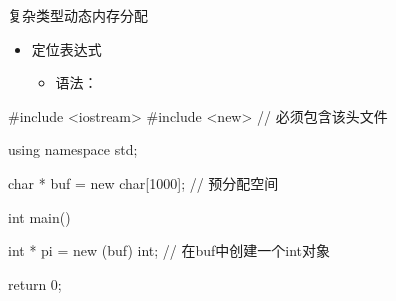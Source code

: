 \begin{frame}[fragile]{复杂类型}{动态内存分配}
  \begin{itemize}
  \item 定位表达式
    \begin{itemize}
    \item 语法：
    \end{itemize}  
  \end{itemize}
  \begin{center}
    \begin{minipage}{0.7\linewidth}
      \begin{cppcode}
#include <iostream>
#include <new> // 必须包含该头文件

using namespace std;

char * buf = new char[1000]; // 预分配空间        

int main()
{
    int * pi = new (buf) int; // 在buf中创建一个int对象

    return 0;
}
      \end{cppcode}
    \end{minipage}
  \end{center}
\end{frame}

